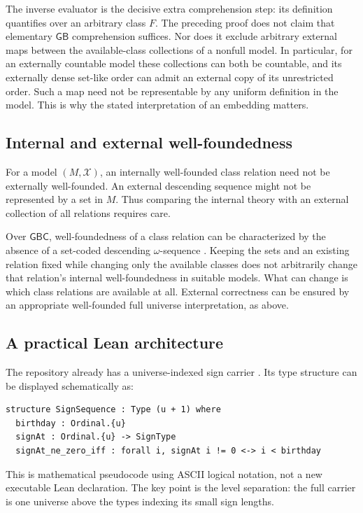 \documentclass[11pt]{article}
\theoremstyle{definition}
\theoremstyle{remark}
\newcommand{\GB}{\mathsf{GB}}
\newcommand{\GBC}{\mathsf{GBC}}
\begin{document}
The inverse evaluator is the decisive extra comprehension
step: its definition quantifies over an arbitrary class
\(F\). The preceding proof does not claim that elementary
\(\GB\) comprehension suffices.
Nor does it exclude arbitrary external maps between the
available-class collections of a nonfull model. In particular,
for an externally countable model these collections can both
be countable, and its externally dense set-like order can
admit an external copy of its unrestricted order. Such a map
need not be representable by any uniform definition in the
model. This is why the stated interpretation of an embedding
matters.

\subsection{Internal and external well-foundedness}

For a model \((M,\mathcal X)\), an internally well-founded
class relation need not be externally well-founded. An external
descending sequence might not be represented by a set in \(M\).
Thus comparing the internal theory with an external collection
of all relations requires care.

Over \(\GBC\), well-foundedness of a class relation can be
characterized by the absence of a set-coded descending
\(\omega\)-sequence \cite[Section 3]{HamkinsWoodin}. Keeping
the sets and an existing relation fixed while changing only
the available classes does not arbitrarily change that
relation's internal well-foundedness in suitable models.
What can change is which class relations are available at all.
External correctness can be ensured by an appropriate
well-founded full universe interpretation, as above.

\subsection{A practical Lean architecture}

The repository already has a universe-indexed sign carrier
\cite{ProveItSigns}. Its type structure can be displayed schematically as:
\begin{lstlisting}
structure SignSequence : Type (u + 1) where
  birthday : Ordinal.{u}
  signAt : Ordinal.{u} -> SignType
  signAt_ne_zero_iff : forall i, signAt i != 0 <-> i < birthday
\end{lstlisting}
This is mathematical pseudocode using ASCII logical notation,
not a new executable Lean declaration. The key point
is the level separation: the full carrier is one universe
above the types indexing its small sign lengths.
\end{document}
